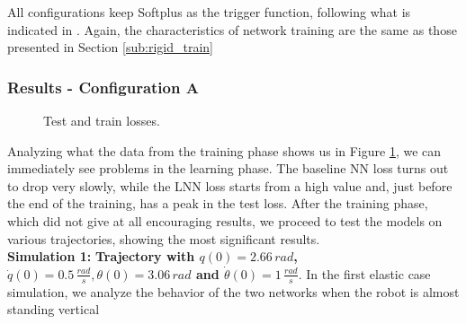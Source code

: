 \documentclass[a4paper]{article}
\begin{document}
All configurations keep Softplus as the trigger function, following what is indicated in \cite{lnncranmer}. Again, the characteristics of network training are the same as those presented in Section \ref{sub:rigid_train}
\subsubsection{Results - Configuration A}
\begin{figure}
    \centering
    \qquad
    \caption{Test and train losses.}
    \label{fig:elastic_losses_300_2}
\end{figure}

Analyzing what the data from the training phase shows us in Figure \ref{fig:elastic_losses_300_2}, we can immediately see problems in the learning phase. The baseline NN loss turns out to drop very slowly, while the LNN loss starts from a high value and, just before the end of the training, has a peak in the test loss. After the training phase, which did not give at all encouraging results, we proceed to test the models on various trajectories, showing the most significant results.\\

\textbf{Simulation 1:} \textbf{Trajectory with $q(0)=2.66\, rad$, $\dot{q}(0)=0.5\, \frac{rad}{s}, \theta(0)=3.06\, rad$ and $\dot{\theta}(0)=1\, \frac{rad}{s}.$}
In the first elastic case simulation, we analyze the behavior of the two networks when the robot is almost standing vertical
\end{document}
